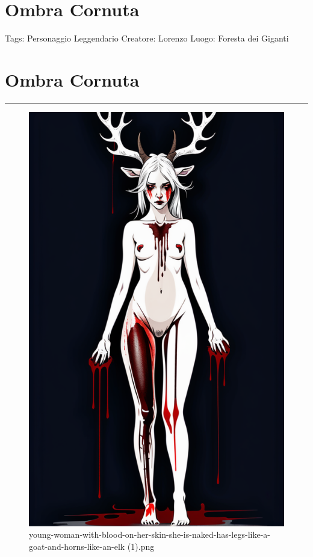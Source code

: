 \section{Ombra Cornuta}\label{ombra-cornuta}

Tags: Personaggio Leggendario Creatore: Lorenzo Luogo: Foresta dei
Giganti

\section{Ombra Cornuta}\label{ombra-cornuta-1}

\begin{center}\rule{0.5\linewidth}{0.5pt}\end{center}

\begin{figure}
\centering
\includegraphics{young-woman-with-blood-on-her-skin-she-is-naked-has-legs-like-a-goat-and-horns-like-an-elk_(1).png}
\caption{young-woman-with-blood-on-her-skin-she-is-naked-has-legs-like-a-goat-and-horns-like-an-elk
(1).png}
\end{figure}

